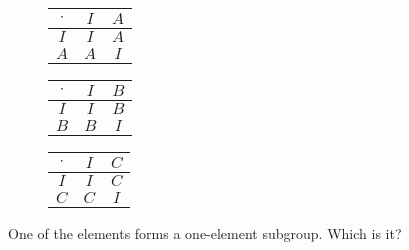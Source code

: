 \documentclass[../key.tex]{subfiles}
\begin{document}
\begin{figure}[h]
	\begin{center}
		\begin{minipage}[b]{0.3\textwidth}
			\centering
			\begin{tabular}{c|cc}
				\hline
				$\cdot$ & $I$ & $A$ \\ \hline
				\rowcolor{light-gray}
				$I$ & $I$ & $A$ \\
				$A$ & $A$ & $I$ \\ \hline
			\end{tabular}
			\vspace*{0.5\baselineskip}
		\end{minipage}
		\hfill
		\begin{minipage}[b]{0.3\textwidth}
			\centering
			\begin{tabular}{c|cc}
				\hline
				$\cdot$ & $I$ & $B$ \\ \hline
				\rowcolor{light-gray}
				$I$ & $I$ & $B$ \\
				$B$ & $B$ & $I$ \\ \hline
			\end{tabular}
			\vspace*{0.5\baselineskip}
		\end{minipage}
		\hfill
		\begin{minipage}[b]{0.3\textwidth}
			\centering
			\begin{tabular}{c|cc}
				\hline
				$\cdot$ & $I$ & $C$ \\ \hline
				\rowcolor{light-gray}
				$I$ & $I$ & $C$ \\
				$C$ & $C$ & $I$ \\ \hline
			\end{tabular}
			\vspace*{0.5\baselineskip}
		\end{minipage}
	\end{center}
	\vspace*{-2\baselineskip}
	\begin{center}
		\begin{minipage}[t]{\textwidth}
			\label{fig:two_elem_subgroups}
		\end{minipage}
	\end{center}
	\vspace*{-2\baselineskip}
\end{figure}

\begin{outer_problem}
\item One of the elements forms a one-element subgroup. Which is it?
\end{outer_problem}
\end{document}
